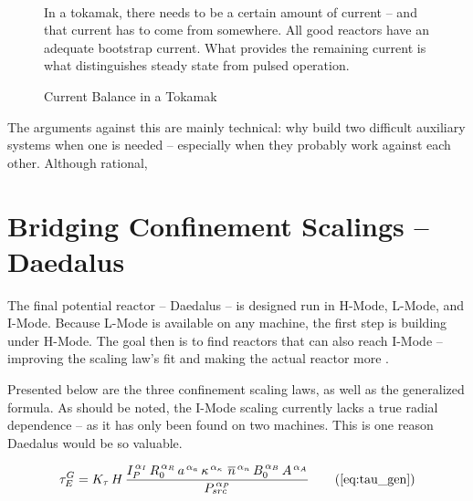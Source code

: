 \begin{figure}
	\centering
	\begin{adjustbox}{width=0.75\textwidth}
		
	\end{adjustbox}
	\caption{Current Balance in a Tokamak} ~\\
	\small In a tokamak, there needs to be a certain amount of current -- and that current has to come from somewhere. All good reactors have an adequate bootstrap current. What provides the remaining current is what distinguishes steady state from pulsed operation.
\end{figure}

The arguments against this are mainly technical: why build two difficult auxiliary systems when one is needed -- especially when they probably work against each other. Although rational, 

\section{Bridging Confinement Scalings -- Daedalus}

The final potential reactor -- Daedalus -- is designed  run in H-Mode, L-Mode, and I-Mode. Because L-Mode is available on any machine, the first step is  building under H-Mode. The goal then is to find reactors that can also reach I-Mode --  improving the scaling law's fit and  making the actual reactor more .

Presented below are the three confinement scaling laws, as well as the generalized formula. As should be noted, the I-Mode scaling currently lacks a true radial dependence -- as it has only been found on two machines. This is one reason Daedalus would be so valuable.

\begin{equation}
  \tau_E^G = K_\tau \, H \, \frac{
    I_P^{\,\alpha_I} \, R_0^{\,\alpha_R} \, a^{\,\alpha_a} \, \kappa^{\,\alpha_\kappa} \ \overline{n}^{\,\alpha_n} \, B_0^{\,\alpha_B} \, A^{\,\alpha_A}
  }{ P_{src} ^ {\,\alpha_P} }
  \tag{\ref{eq:tau_gen}}
\end{equation}

